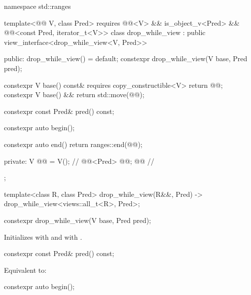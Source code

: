 %
%
%
\begin{codeblock}
namespace std::ranges {
  template<@@ V, class Pred>
    requires @@<V> && is_object_v<Pred> &&
             @@<const Pred, iterator_t<V>>
  class drop_while_view : public view_interface<drop_while_view<V, Pred>> {
  public:
    drop_while_view() = default;
    constexpr drop_while_view(V base, Pred pred);

    constexpr V base() const& requires copy_constructible<V> { return @@; }
    constexpr V base() && { return std::move(@@); }

    constexpr const Pred& pred() const;

    constexpr auto begin();

    constexpr auto end()
    { return ranges::end(@@); }

  private:
    V @@ = V();                                      // \expos
    @@<Pred> @@; @\itcorr[-1]@                       // \expos
  };

  template<class R, class Pred>
    drop_while_view(R&&, Pred) -> drop_while_view<views::all_t<R>, Pred>;
}
\end{codeblock}

%
\begin{itemdecl}
constexpr drop_while_view(V base, Pred pred);
\end{itemdecl}

\begin{itemdescr}
\pnum
\effects
Initializes  with  and
 with .
\end{itemdescr}

%
\begin{itemdecl}
constexpr const Pred& pred() const;
\end{itemdecl}

\begin{itemdescr}
\pnum
\effects
Equivalent to: 
\end{itemdescr}

%
\begin{itemdecl}
constexpr auto begin();
\end{itemdecl}

